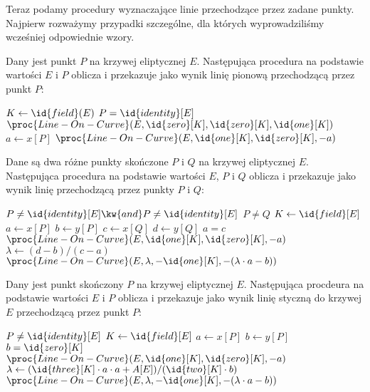 \noindent
Teraz podamy procedury wyznaczające linie przechodzące przez zadane punkty.
Najpierw rozważymy przypadki szczególne,
dla których wyprowadziliśmy wcześniej odpowiednie wzory.

\begin{algorithm}
Dany jest punkt $P$ na krzywej eliptycznej $E$.
Następująca procedura
na podstawie wartości $E$ i $P$
oblicza i przekazuje jako wynik
linię pionową przechodzącą przez punkt $P$:

\begin{codebox}
\li $K \gets \id{field}(E)$
\li \If $P = \id{identity}[E]$
\li     \Then
            \Return $\proc{Line-On-Curve}(E, \id{zero}[K], \id{zero}[K], \id{one}[K])$
\li     \Else
            $a \gets x[P]$
\li         \Return $\proc{Line-On-Curve}(E, \id{one}[K], \id{zero}[K], -a)$
        \End
\end{codebox}
\end{algorithm}

\begin{algorithm}
Dane są dwa różne punkty skończone $P$ i $Q$ na krzywej eliptycznej $E$.
Następująca procedura
na podstawie wartości $E$, $P$ i $Q$
oblicza i przekazuje jako wynik
linię przechodzącą przez punkty $P$ i $Q$:

\begin{codebox}
\li \Assert $P \neq \id{identity}[E] \kw{ and } P \neq \id{identity}[E]$
\li \Assert $P \neq Q$
\li $K \gets \id{field}[E]$
\li $a \gets x[P]$
\li $b \gets y[P]$
\li $c \gets x[Q]$
\li $d \gets y[Q]$
\li \If $a = c$
\li     \Then
            \Return $\proc{Line-On-Curve}(E, \id{one}[K], \id{zero}[K], -a)$
\li     \Else
            $\lambda \gets (d-b)/(c-a)$
\li         \Return $\proc{Line-On-Curve}(E, \lambda, -\id{one}[K], -(\lambda\cdot a - b))$
        \End
\end{codebox}
\end{algorithm}

\begin{algorithm}
Dany jest punkt skończony $P$ na krzywej eliptycznej $E$.
Następująca procdeura
na podstawie wartości $E$ i $P$
oblicza i przekazuje jako wynik
linię styczną do krzywej $E$ przechodzącą przez punkt $P$:

\begin{codebox}
\li \Assert $P \neq \id{identity}[E]$
\li $K \gets \id{field}[E]$
\li $a \gets x[P]$
\li $b \gets y[P]$
\li \If $b = \id{zero}[K]$
\li     \Then
            \Return $\proc{Line-On-Curve}(E, \id{one}[K], \id{zero}[K], -a)$
\li     \Else
            $\lambda \gets (\id{three}[K]\cdot a \cdot a + A[E])/(\id{two}[K]\cdot b)$
\li         \Return $\proc{Line-On-Curve}(E, \lambda, -\id{one}[K], -(\lambda\cdot a - b))$
        \End
\end{codebox}
\end{algorithm}


